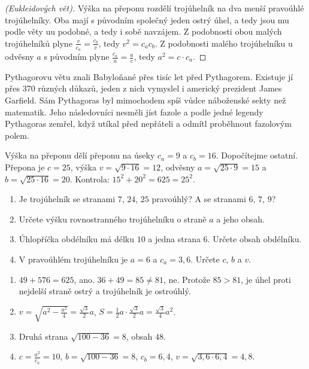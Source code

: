 \begin{proof}[(Eukleidových vět)]
  Výška na přeponu rozdělí trojúhelník na dva menší pravoúhlé trojúhelníky. Oba mají s původním společný jeden ostrý úhel, a tedy jsou mu podle věty uu podobné, a tedy i sobě navzájem. Z podobnosti obou malých trojúhelníků plyne $\frac{v}{c_a} = \frac{c_b}{v}$, tedy $v^2 = c_ac_b$. Z podobnosti malého trojúhelníku u odvěsny $a$ s původním plyne $\frac{c_a}{a} = \frac{a}{c}$, tedy $a^2 = c\cdot c_a$.
\end{proof}

Pythagorovu větu znali Babyloňané přes tisíc let před Pythagorem. Existuje jí přes 370 různých důkazů, jeden z nich vymyslel i americký prezident James Garfield. Sám Pythagoras byl mimochodem spíš vůdce náboženské sekty než matematik. Jeho následovníci nesměli jíst fazole a podle jedné legendy Pythagoras zemřel, když utíkal před nepřáteli a odmítl proběhnout fazolovým polem.

\begin{example}
  Výška na přeponu dělí přeponu na úseky $c_a = 9$ a $c_b = 16$. Dopočítejme ostatní. Přepona je $c = 25$, výška $v = \sqrt{9\cdot 16} = 12$, odvěsny $a = \sqrt{25\cdot 9} = 15$ a $b = \sqrt{25\cdot 16} = 20$. Kontrola: $15^2 + 20^2 = 625 = 25^2$.
\end{example}

\begin{problem}
  \begin{enumerate}[label=(\alph*)]
    \item Je trojúhelník se stranami $7$, $24$, $25$ pravoúhlý? A se stranami $6$, $7$, $9$?
    \item Určete výšku rovnostranného trojúhelníku o straně $a$ a jeho obsah.
    \item Úhlopříčka obdélníku má délku $10$ a jedna strana $6$. Určete obsah obdélníku.
    \item V pravoúhlém trojúhelníku je $a = 6$ a $c_a = 3{,}6$. Určete $c$, $b$ a $v$.
  \end{enumerate}
\end{problem}

\begin{solution}
  \begin{enumerate}[label=(\alph*)]
    \item $49 + 576 = 625$, ano. $36 + 49 = 85\neq 81$, ne. Protože $85 > 81$, je úhel proti nejdelší straně ostrý a trojúhelník je ostroúhlý.
    \item $v = \sqrt{a^2 - \frac{a^2}{4}} = \frac{\sqrt{3}}{2}a$, $S = \frac{1}{2}a\cdot\frac{\sqrt{3}}{2}a = \frac{\sqrt{3}}{4}a^2$.
    \item Druhá strana $\sqrt{100 - 36} = 8$, obsah $48$.
    \item $c = \frac{a^2}{c_a} = 10$, $b = \sqrt{100 - 36} = 8$, $c_b = 6{,}4$, $v = \sqrt{3{,}6\cdot 6{,}4} = 4{,}8$.
  \end{enumerate}
\end{solution}

